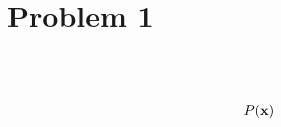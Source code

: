 \section{Problem 1}~\label{sec:prob1}

\subsection{} %

\begin{equation}
\begin{split}
    P({\mathbf{x}})
\end{split}
\end{equation}

\subsection{} %

\subsection{} %
